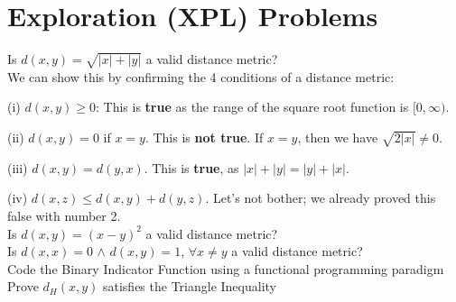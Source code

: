 \section{Exploration (XPL) Problems}

\begin{outline}[enumerate]

\1  Is $d(x,y) = \sqrt{|x| + |y|}$ a valid distance metric? \\

We can show this by confirming the 4 conditions of a distance metric:

(i) $d(x,y) \ge 0$: This is \textbf{true} as the range of the square root function is $[0,\infty)$.

(ii) $d(x,y) = 0$ if $x=y$. This is \textbf{not true}. If $x=y$, then we have $\sqrt{2|x|} \neq 0$.

(iii) $d(x,y) = d(y,x)$. This is \textbf{true}, as $|x| + |y| = |y| + |x|$.

(iv) $d(x,z) \leq d(x,y) + d(y,z)$. Let's not bother; we already proved this false with number 2. \\


\1  Is $d(x,y) = (x -y)^2$ a valid distance metric? \\

\1 Is $d(x,x) = 0$ $\wedge$ $d(x,y) = 1$, $\forall x \neq y$ a valid distance metric? \\

\1  Code the Binary Indicator Function using a functional programming paradigm \\

\1 Prove $d_H(x,y)$ satisfies the Triangle Inequality
\end{outline}
